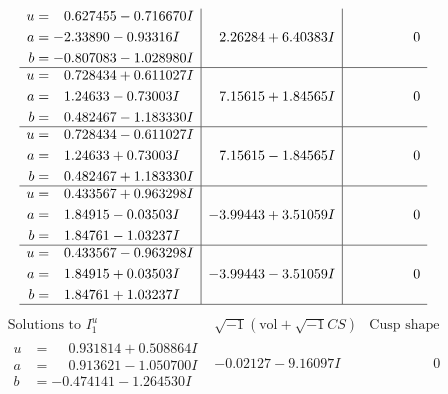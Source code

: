 \documentclass[1p]{elsarticle_modified}
\theoremstyle{definition}
\newcommand{\I}{\sqrt{-1}}
\begin{document}
$$\begin{array}{c|c|c}
\begin{aligned}
u &= \phantom{-}0.627455 - 0.716670 I \\
a &= -2.33890 - 0.93316 I \\
b &= -0.807083 - 1.028980 I\end{aligned}
 & \phantom{-}2.26284 + 6.40383 I & \phantom{-0.000000 } 0 \\ \hline\begin{aligned}
u &= \phantom{-}0.728434 + 0.611027 I \\
a &= \phantom{-}1.24633 - 0.73003 I \\
b &= \phantom{-}0.482467 - 1.183330 I\end{aligned}
 & \phantom{-}7.15615 + 1.84565 I & \phantom{-0.000000 } 0 \\ \hline\begin{aligned}
u &= \phantom{-}0.728434 - 0.611027 I \\
a &= \phantom{-}1.24633 + 0.73003 I \\
b &= \phantom{-}0.482467 + 1.183330 I\end{aligned}
 & \phantom{-}7.15615 - 1.84565 I & \phantom{-0.000000 } 0 \\ \hline\begin{aligned}
u &= \phantom{-}0.433567 + 0.963298 I \\
a &= \phantom{-}1.84915 - 0.03503 I \\
b &= \phantom{-}1.84761 - 1.03237 I\end{aligned}
 & -3.99443 + 3.51059 I & \phantom{-0.000000 } 0 \\ \hline\begin{aligned}
u &= \phantom{-}0.433567 - 0.963298 I \\
a &= \phantom{-}1.84915 + 0.03503 I \\
b &= \phantom{-}1.84761 + 1.03237 I\end{aligned}
 & -3.99443 - 3.51059 I & \phantom{-0.000000 } 0\\
 \hline 
 \end{array}$$\newpage$$\begin{array}{c|c|c}  
\text{Solutions to }I^u_{1}& \I (\text{vol} + \sqrt{-1}CS) & \text{Cusp shape}\\
 \hline 
\begin{aligned}
u &= \phantom{-}0.931814 + 0.508864 I \\
a &= \phantom{-}0.913621 - 1.050700 I \\
b &= -0.474141 - 1.264530 I\end{aligned}
 & -0.02127 - 9.16097 I & \phantom{-0.000000 } 0 \\ \hline\begin{aligned}

\end{aligned}
\end{array}$$
\end{document}
